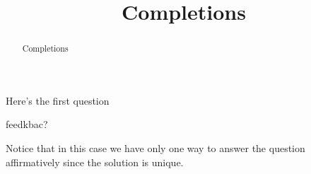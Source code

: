 \documentclass{ximera}
\title{Completions}
\begin{document}
\begin{abstract}
  Completions
\end{abstract}
\maketitle

  \begin{question}
    Here's the first question
    \begin{multipleChoice}
    \end{multipleChoice}
    feedkbac?
    \begin{feedback}[correct]
      \begin{question}
        \begin{multipleChoice}
        \end{multipleChoice}

        \begin{feedback}[correct]
          Notice that in this case we have only one way to answer the
          question affirmatively since the solution is unique.
        \end{feedback}
      \end{question}
    \end{feedback}
  \end{question}
\end{document}
